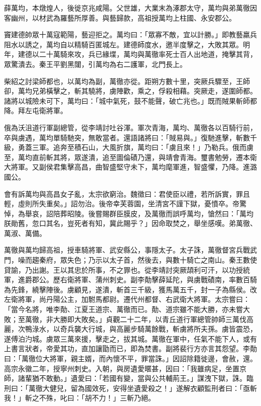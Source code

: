 \begin{pinyinscope}
 薛萬均，本燉煌人，後徙京兆咸陽。父世雄，大業末為涿郡太守，萬均與弟萬徹因客幽州，以材武為羅藝所厚善。與藝歸款，高祖授萬均上柱國、永安郡公。



 竇建德帥眾十萬寇範陽，藝迎拒之。萬均曰：「眾寡不敵，宜以計勝。」即教藝羸兵阻水以誘之，萬均自以精騎百匿城左。建德師度水，邀半度擊之，大敗其眾。明年，建德以二十萬騎來攻，兵已緣堞，萬均與萬徹率死士百人出地道，掩擊其背，眾驚潰去。秦王平劉黑闥，引萬均為右二護軍，北門長上。



 柴紹之討梁師都也，以萬均為副，萬徹亦從。距朔方數十里，突厥兵驟至，王師卻，萬均兄弟橫擊之，斬其驍將，虜陣歡，乘之，俘殺相藉。突厥走，遂圍師都。諸將以城險未可下，萬均曰：「城中氣死，鼓不能聲，破亡兆也。」既而賊果斬師都降。拜左屯衛將軍。



 俄為沃沮道行軍副總管，從李靖討吐谷渾。軍次青海，萬均、萬徹各以百騎行前，卒與虜遇，萬均單騎馳突，無敢當者。還語諸將曰：「賊易與。」復馳進擊，斬數千級，勇蓋三軍。追奔至積石山，大風折旗，萬均曰：「虜且來！」乃勒兵。俄而虜至，萬均直前斬其將，眾遂潰，追至圖倫磧乃還，與靖會青海。璽書勉勞，遷本衛大將軍。又副侯君集擊高昌，曲智盛堅守未下，萬均麾軍進，智盛懼，乃降。進潞國公。



 會有訴萬均與高昌女子亂，太宗欲窮治。魏徵曰：君使臣以禮，若所訴實，罪且輕，虛則所失重矣。」詔勿治。後帝幸芙蓉園，坐清宮不謹下獄，憂憤卒。帝驚悼，為舉哀，詔陪葬昭陵。後嘗賜群臣膜皮，及萬徹而誤呼萬均，愴然曰：「萬均朕勛舊，忽口其名，豈死者有知，冀此賜乎？」因命取焚之，舉坐感嘆。弟萬徹、萬淑、萬備。



 萬徹與萬均歸高祖，授車騎將軍、武安縣公，事隱太子。太子誅，萬徹督宮兵戰武門，噪而趨秦府，眾失色；乃示以太子首，然後去，與數十騎亡之南山。秦王數使貸諭，乃出謝。王以其忠於所事，不之罪也。從李靖討突厥頡利可汗，以功授統軍，進爵郡公。歷右衛將軍、蒲州刺史。副李勣擊薛延陀，與虜戰磧南，率數百騎為先鋒，繞擊陣後。虜顧見，遂潰，斬首三千級，獲馬萬五千，封一子為縣侯。改左衛將軍，尚丹陽公主，加駙馬都尉。遷代州都督、右武衛大將軍。太宗嘗曰：「當今名將，唯李勣、江夏王道宗、萬徹而已。勣、道宗雖不能大勝，亦未嘗大敗；至萬徹，非大勝即大敗矣。」貞觀二十二年，以青丘道行軍總管帥師三萬伐高麗，次鴨淥水，以奇兵襲大行城，與高麗步騎萬餘戰，斬虜將所夫孫。虜皆震恐，遂傅泊汋城。虜眾三萬來援，擊走之，拔其城。萬徹在軍中，任氣不能下人，或有上書言狀者，帝愛其功，直加讓勖而已，即為焚書。副將裴行方亦言其怨望。李勣曰：「萬徹位大將軍，親主婿，而內懷不平，罪當誅。」因詔除籍徙邊，會赦，還。高宗永徽二年，授寧州刺史。入朝，與房遺愛暱甚，因曰：「我雖病足，坐置京師，諸輩猶不敢動。」遺愛曰：「若國有變，當與公共輔荊王。」謀洩下獄，誅。臨刑曰：「萬徹大健兒，留為國效死，安得坐遺愛殺之！」遂解衣顧監刑者曰：「亟斬我！」斬之不殊，叱曰：「胡不力！」三斬乃絕。




\end{pinyinscope}
